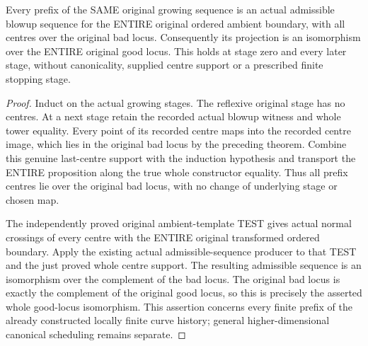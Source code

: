 \begin{theorem}
\label{hir:sharp-actual-curve-growing-prefix-original-good-isomorphism}
\leanok
Every prefix of the SAME original growing sequence is an actual
admissible blowup sequence for the ENTIRE original ordered ambient
boundary, with all centres over the original bad locus. Consequently
its projection is an isomorphism over the ENTIRE original good locus.
This holds at stage zero and every later stage, without canonicality,
supplied centre support or a prescribed finite stopping stage.
\end{theorem}
\begin{proof}
Induct on the actual growing stages. The reflexive original stage has no
centres. At a next stage retain the recorded actual blowup witness and
whole tower equality. Every point of its recorded centre maps into the
recorded centre image, which lies in the original bad locus by the
preceding theorem. Combine this genuine last-centre support with the
induction hypothesis and transport the ENTIRE proposition along the
true whole constructor equality. Thus all prefix centres lie over the
original bad locus, with no change of underlying stage or chosen map.

The independently proved original ambient-template TEST gives actual
normal crossings of every centre with the ENTIRE original transformed
ordered boundary. Apply the existing actual admissible-sequence producer
to that TEST and the just proved whole centre support. The resulting
admissible sequence is an isomorphism over the complement of the bad
locus. The original bad locus is exactly the complement of the original
good locus, so this is precisely the asserted whole good-locus
isomorphism. This assertion concerns every finite prefix of the already
constructed locally finite curve history; general higher-dimensional
canonical scheduling remains separate.
\end{proof}

